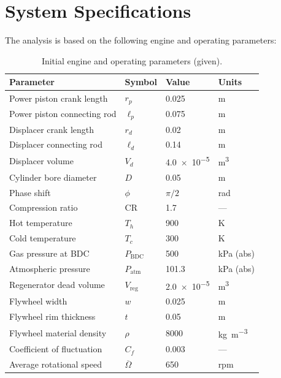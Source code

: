 \documentclass[12pt]{article}
\begin{document}
\section{System Specifications}
The analysis is based on the following engine and operating parameters:
\begin{table}[H]
  \centering
  \caption{Initial engine and operating parameters (given).}
  \label{tab:params}
  \begin{tabular}{@{}llll@{}}
    \toprule
    \textbf{Parameter} & \textbf{Symbol} & \textbf{Value} & \textbf{Units} \\
    \midrule
    Power piston crank length & $r_{p}$ & \num{0.025} & \si{\meter} \\
    Power piston connecting rod & $\ell_{p}$ & \num{0.075} & \si{\meter} \\
    Displacer crank length & $r_{d}$ & \num{0.02} & \si{\meter} \\
    Displacer connecting rod & $\ell_{d}$ & \num{0.14} & \si{\meter} \\
    Displacer volume & $V_{d}$ & \num{4.0e-5} & \si{\meter\cubed} \\
    Cylinder bore diameter & $D$ & \num{0.05} & \si{\meter} \\
    Phase shift & $\phi$ & $\pi/2$ & \si{\radian} \\
    Compression ratio & $\mathrm{CR}$ & \num{1.7} & --- \\
    Hot temperature & $T_{h}$ & \num{900} & \si{\kelvin} \\
    Cold temperature & $T_{c}$ & \num{300} & \si{\kelvin} \\
    Gas pressure at BDC & $P_{\mathrm{BDC}}$ & \num{500} & \si{\kilo\pascal} (abs) \\
    Atmospheric pressure & $P_{\mathrm{atm}}$ & \num{101.3} & \si{\kilo\pascal} (abs) \\
    Regenerator dead volume & $V_{\mathrm{reg}}$ & \num{2.0e-5} & \si{\meter\cubed} \\
    Flywheel width & $w$ & \num{0.025} & \si{\meter} \\
    Flywheel rim thickness & $t$ & \num{0.05} & \si{\meter} \\
    Flywheel material density & $\rho$ & \num{8000} & \si{\kilo\gram\per\meter\cubed} \\
    Coefficient of fluctuation & $C_{f}$ & \num{0.003} & --- \\
    Average rotational speed & $\overline{\Omega}$ & \num{650} & \si{rpm} \\
    \bottomrule
  \end{tabular}
\end{table}
\end{document}
